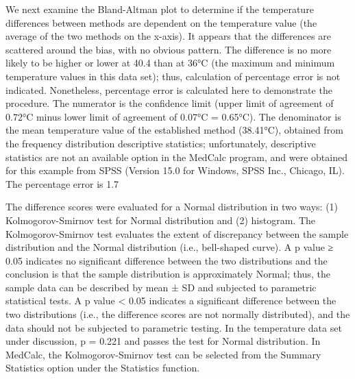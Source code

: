 \documentclass[]{article}
\begin{document}
We next examine the Bland-Altman plot to determine if the temperature differences between methods are dependent on the temperature value (the average of the two methods on the x-axis). It appears that the differences are scattered around the bias, with no obvious pattern. The difference is no more likely to be higher or lower at 40.4 than at 36°C (the maximum and minimum temperature values in this data set); thus, calculation of percentage error is not indicated. Nonetheless, percentage error is calculated here to demonstrate the procedure. The numerator is the confidence limit (upper limit of agreement of 0.72°C minus lower limit of agreement of 0.07°C = 0.65°C). The denominator is the mean temperature value of the established method (38.41°C), obtained from the frequency distribution descriptive statistics; unfortunately, descriptive statistics are not an available option in the MedCalc program, and were obtained for this example from SPSS (Version 15.0 for Windows, SPSS Inc., Chicago, IL). The percentage error is 1.7%

The difference scores were evaluated for a Normal distribution in two ways: (1) Kolmogorov-Smirnov test for Normal distribution and (2) histogram. The Kolmogorov-Smirnov test evaluates the extent of discrepancy between the sample distribution and the Normal distribution (i.e., bell-shaped curve). A p value ≥ 0.05 indicates no significant difference between the two distributions and the conclusion is that the sample distribution is approximately Normal; thus, the sample data can be described by mean ± SD and subjected to parametric statistical tests. A p value < 0.05 indicates a significant difference between the two distributions (i.e., the difference scores are not normally distributed), and the data should not be subjected to parametric testing. In the temperature data set under discussion, p = 0.221 and passes the test for Normal distribution. In MedCalc, the Kolmogorov-Smirnov test can be selected from the Summary Statistics option under the Statistics function.
\end{document}

